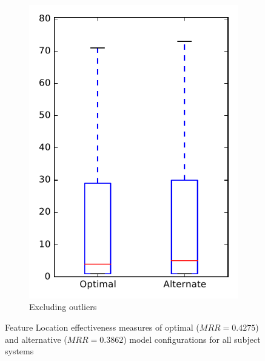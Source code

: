 \begin{figure}
\begin{subfigure}{.4\textwidth}
        \includegraphics[height=0.4\textheight]{figures/combo/flt_rq1_overview_no_outlier}
        \caption{Excluding outliers}\label{fig:combo:flt:rq1:overview_no_outlier}
    \end{subfigure}
\caption{Feature Location effectiveness measures of optimal ($MRR=0.4275$) and alternative ($MRR=0.3862$) model configurations for all subject systems}
\label{fig:combo:flt:rq1:overview}
\end{figure}
